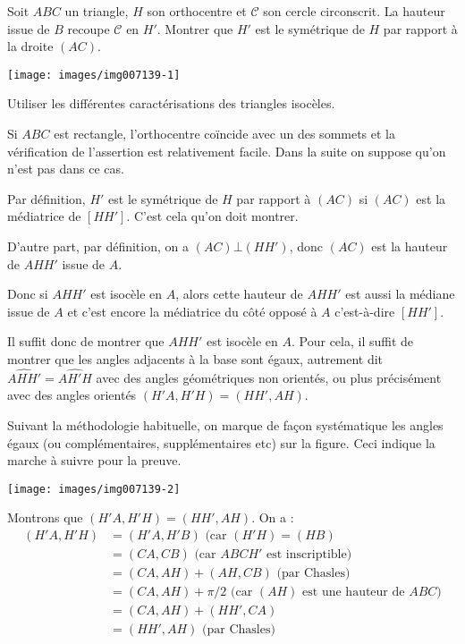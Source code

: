 \begin{exo}%

Soit $ABC$ un triangle, $H$ son orthocentre et $\mathcal C$ son cercle circonscrit. La hauteur issue de $B$ recoupe $\mathcal C$ en $H'$. Montrer que $H'$ est le symétrique de $H$ par rapport à la droite $(AC)$. 

\begin{center}
\texttt{[image: images/img007139-1]}
\end{center}



\begin{hint}
Utiliser les différentes caractérisations des triangles isocèles.
\end{hint}

\begin{sol}

Si $ABC$ est rectangle, l'orthocentre coïncide avec un des sommets et la vérification de l'assertion est relativement facile. Dans la suite on suppose qu'on n'est pas dans ce cas.

Par définition, $H'$ est le symétrique de $H$ par rapport à $(AC)$ si $(AC)$ est la médiatrice de $[HH']$. C'est cela qu'on doit montrer.



D'autre part, par définition, on a $(AC) \bot (HH')$, donc $(AC)$ est la hauteur de $AHH'$ issue de $A$. 

Donc si $AHH'$ est isocèle en $A$, alors cette hauteur de $AHH'$  est aussi la médiane issue de $A$ et c'est encore la médiatrice du côté opposé à $A$ c'est-à-dire $[HH']$.

Il suffit donc de montrer que $AHH'$ est isocèle en $A$. Pour cela, il suffit de montrer que les angles adjacents à la base sont égaux, autrement dit $\widehat{AHH'} = \widehat{AH'H}$ avec des angles géométriques non orientés, ou plus précisément avec des angles orientés $(H'A,H'H)=(HH',AH)$.

Suivant la méthodologie habituelle, on marque de façon systématique les angles égaux (ou complémentaires, supplémentaires etc) sur la figure. Ceci indique la marche à suivre pour la preuve.


\begin{center}
\texttt{[image: images/img007139-2]}
\end{center}

Montrons que $(H'A,H'H)=(HH',AH)$. On a :
\begin{align*}
(H'A,H'H) &= (H'A,H'B) \text{ (car $(H'H)=(HB)$}\\
&= (CA,CB) \text{ (car $ABCH'$ est inscriptible)}\\
&= (CA,AH)+(AH,CB) \text{ (par Chasles)}\\
&= (CA,AH)+\pi/2 \text{ (car $(AH)$ est une hauteur de $ABC$)}\\
&= (CA,AH)+(HH',CA)\\
&= (HH',AH) \text{ (par Chasles)}
\end{align*}


\end{sol}
\end{exo}

